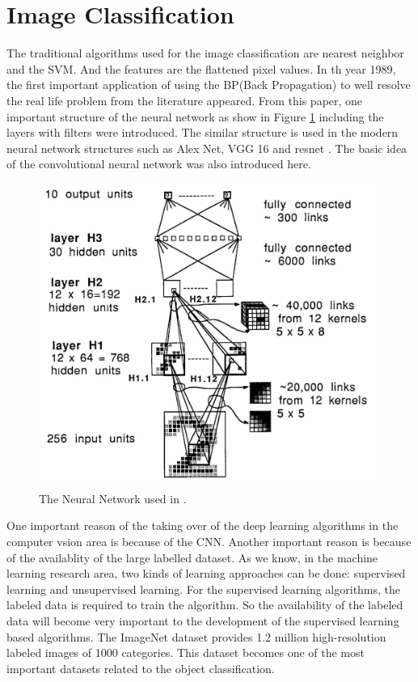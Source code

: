 \documentclass[a4paper,12pt]{article}
\begin{document}
\section{Image Classification}
The traditional algorithms used for the image classification are nearest neighbor and the SVM. And the features are the flattened pixel values. In th year 1989, the first important application of using the BP(Back Propagation) to well resolve the real life problem from the literature appeared. From this paper, one important structure of the neural network as show in Figure \ref{fig:bpzip} including the layers with filters were introduced. The similar structure is used in the modern neural network structures such as Alex Net\cite{NIPS2012_4824}, VGG 16  \cite{SimonyanZ14a} and resnet \cite{DBLP:journals/corr/HeZRS15}. The basic idea of the convolutional neural network was also introduced here.
\begin{figure}[H]
  \begin{center}
      \includegraphics[scale=0.8]{bpzip.png}
\end{center}
\caption{The Neural Network used in \cite{doi:10.1162/neco.1989.1.4.541}.}
 \label{fig:bpzip}
 \end{figure}
One important reason of the taking over of the deep learning algorithms in the computer vsion area is because of the CNN. Another important reason is because of the availablity of the large labelled dataset. As we know, in the machine learning research area, two kinds of learning approaches can be done: supervised learning and unsupervised learning. For the supervised learning algorithms, the labeled data is required to train the algorithm. So the availability of the labeled data will become very important to the development of the supervised learning based algorithms. The ImageNet dataset \cite{imagenet_cvpr09} provides 1.2 million high-resolution labeled images of 1000 categories. This dataset becomes one of the most important datasets related to the object classification.\\
\end{document}

